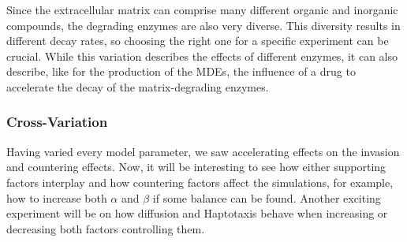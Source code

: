 Since the extracellular matrix can comprise many different organic and inorganic compounds, the degrading enzymes are also very diverse. This diversity results in different decay rates, so choosing the right one for a specific experiment can be crucial. While this variation describes the effects of different enzymes, it can also describe, like for the production of the MDEs, the influence of a drug to accelerate the decay of the matrix-degrading enzymes.

\subsubsection*{Cross-Variation}
Having varied every model parameter, we saw accelerating effects on the invasion and countering effects. Now, it will be interesting to see how either supporting factors interplay and how countering factors affect the simulations, for example, how to increase both $\alpha$ and $\beta$ if some balance can be found. Another exciting experiment will be on how diffusion and Haptotaxis behave when increasing or decreasing both factors controlling them.

